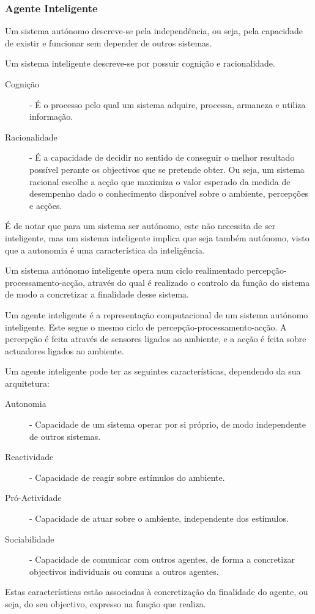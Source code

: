 \documentclass[a4paper,12pt]{article}
\begin{document}
\subsubsection{Agente Inteligente}
Um sistema autónomo descreve-se pela independência, ou seja, pela capacidade de existir e funcionar sem depender de outros sistemas.

Um sistema inteligente descreve-se por possuir cognição e racionalidade.

\begin{description}
	\item[Cognição] - É o processo pelo qual um sistema adquire, processa, armaneza e utiliza informação.
	\item[Racionalidade] - É a capacidade de decidir no sentido de conseguir o melhor resultado possível perante os objectivos que se pretende obter. Ou seja, um sistema racional escolhe a acção que maximiza o valor esperado da medida de desempenho dado o conhecimento disponível sobre o ambiente, percepções e acções.
\end{description}

É de notar que para um sistema ser autónomo, este não necessita de ser inteligente, mas um sistema inteligente implica que seja também autónomo, visto que a autonomia é uma característica da inteligência.

Um sistema autónomo inteligente opera num ciclo realimentado percepção-processamento-acção, através do qual é realizado o controlo da função do sistema de modo a concretizar a finalidade desse sistema.

Um agente inteligente é a representação computacional de um sistema autónomo inteligente. Este segue o mesmo ciclo de percepção-processamento-acção. A percepção é feita através de sensores ligados ao ambiente, e a acção é feita sobre actuadores ligados ao ambiente.

Um agente inteligente pode ter as seguintes características, dependendo da sua arquitetura:
\begin{description}
	\item[Autonomia] - Capacidade de um sistema operar por si próprio, de modo independente de outros sistemas.
	\item[Reactividade] - Capacidade de reagir sobre estímulos do ambiente.
	\item[Pró-Actividade] - Capacidade de atuar sobre o ambiente, independente dos estímulos.
	\item[Sociabilidade] - Capacidade de comunicar com outros agentes, de forma a concretizar objectivos individuais ou comuns a outros agentes.
\end{description}
Estas características estão associadas à concretização da finalidade do agente, ou seja, do seu objectivo, expresso na função que realiza.
\end{document}
